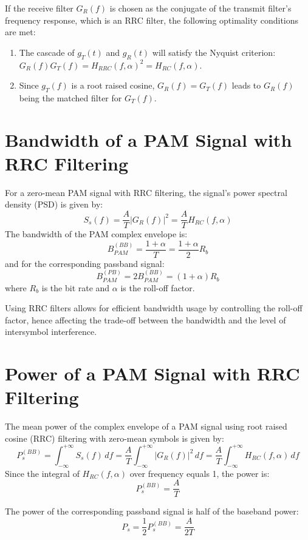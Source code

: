If the receive filter \( G_R(f) \) is chosen as the conjugate of the transmit filter's frequency response, which is an RRC filter, the following optimality conditions are met:
\begin{enumerate}
    \item The cascade of \( g_T(t) \) and \( g_R(t) \) will satisfy the Nyquist criterion: \( G_R(f)G_T(f) = H_{RRC}(f, \alpha)^2 = H_{RC}(f, \alpha) \).
    \item Since \( g_T(f) \) is a root raised cosine, \( G_R(f) = G_T(f) \) leads to \( G_R(f) \) being the matched filter for \( G_T(f) \).
\end{enumerate}

\section*{Bandwidth of a PAM Signal with RRC Filtering}

For a zero-mean PAM signal with RRC filtering, the signal's power spectral density (PSD) is given by:
\[ S_s(f) = \frac{A}{T} |G_R(f)|^2 = \frac{A}{T} H_{RC}(f, \alpha) \]
The bandwidth of the PAM complex envelope is:
\[ B_{PAM}^{(BB)} = \frac{1 + \alpha}{T} = \frac{1 + \alpha}{2} R_b \]
and for the corresponding passband signal:
\[ B_{PAM}^{(PB)} = 2 B_{PAM}^{(BB)} = (1 + \alpha) R_b \]
where \( R_b \) is the bit rate and \( \alpha \) is the roll-off factor.

Using RRC filters allows for efficient bandwidth usage by controlling the roll-off factor, hence affecting the trade-off between the bandwidth and the level of intersymbol interference.


\section*{Power of a PAM Signal with RRC Filtering}

The mean power of the complex envelope of a PAM signal using root raised cosine (RRC) filtering with zero-mean symbols is given by:
\[ P_s^{(BB)} = \int_{-\infty}^{+\infty} S_s(f) \, df = \frac{A}{T} \int_{-\infty}^{+\infty} |G_R(f)|^2 \, df = \frac{A}{T} \int_{-\infty}^{+\infty} H_{RC}(f, \alpha) \, df \]
Since the integral of \( H_{RC}(f, \alpha) \) over frequency equals 1, the power is:
\[ P_s^{(BB)} = \frac{A}{T} \]

The power of the corresponding passband signal is half of the baseband power:
\[ P_s = \frac{1}{2} P_s^{(BB)} = \frac{A}{2T} \]

